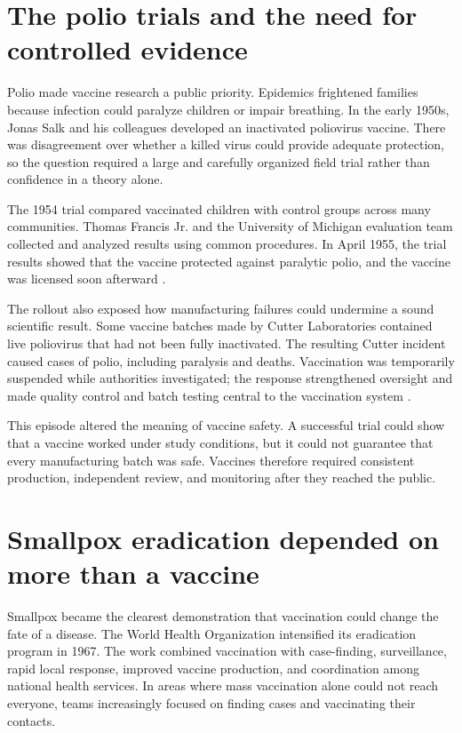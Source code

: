 \documentclass[12pt,oneside]{book}
\begin{document}
\section{The polio trials and the need for controlled evidence}
Polio made vaccine research a public priority. Epidemics frightened families
because infection could paralyze children or impair breathing. In the early
1950s, Jonas Salk and his colleagues developed an inactivated poliovirus
vaccine. There was disagreement over whether a killed virus could provide
adequate protection, so the question required a large and carefully organized
field trial rather than confidence in a theory alone.

The 1954 trial compared vaccinated children with control groups across many
communities. Thomas Francis Jr. and the University of Michigan evaluation team
collected and analyzed results using common procedures. In April 1955, the
trial results showed that the vaccine protected against paralytic polio, and
the vaccine was licensed soon afterward \cite{francisPolio1955}.

The rollout also exposed how manufacturing failures could undermine a sound
scientific result. Some vaccine batches made by Cutter Laboratories contained
live poliovirus that had not been fully inactivated. The resulting Cutter
incident caused cases of polio, including paralysis and deaths. Vaccination
was temporarily suspended while authorities investigated; the response
strengthened oversight and made quality control and batch testing central to
the vaccination system \cite{cdcCutter}.

This episode altered the meaning of vaccine safety. A successful trial could
show that a vaccine worked under study conditions, but it could not guarantee
that every manufacturing batch was safe. Vaccines therefore required
consistent production, independent review, and monitoring after they reached
the public.

\section{Smallpox eradication depended on more than a vaccine}
Smallpox became the clearest demonstration that vaccination could change the
fate of a disease. The World Health Organization intensified its eradication
program in 1967. The work combined vaccination with case-finding, surveillance,
rapid local response, improved vaccine production, and coordination among
national health services. In areas where mass vaccination alone could not
reach everyone, teams increasingly focused on finding cases and vaccinating
their contacts.
\end{document}
